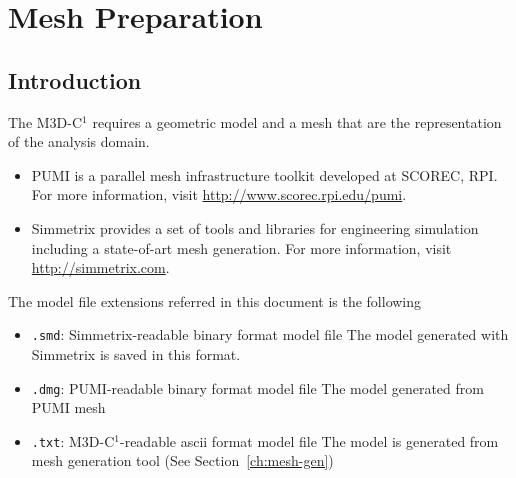 \section{Mesh Preparation}
\subsection{Introduction}

The M3D-C$^{1}$ requires a geometric model and a mesh that are the representation of the analysis domain. 
\begin{itemize}
\item PUMI is a parallel mesh infrastructure toolkit developed at SCOREC, RPI. For more information, visit \href{http://www.scorec.rpi.edu/pumi}{http://www.scorec.rpi.edu/pumi}.
\item	Simmetrix provides a set of tools and libraries for engineering simulation including a state-of-art mesh generation. For more information, visit \href{http://simmetrix.com}{http://simmetrix.com}.
\end{itemize}

The model file extensions referred in this document is the following
\begin{itemize}
\item \texttt{.smd}: Simmetrix-readable binary format model file  
\newline  The model generated with Simmetrix is saved in this format.
\item \texttt{.dmg}: PUMI-readable binary format model file
\newline	The model generated from PUMI mesh
\item	\texttt{.txt}: M3D-C$^{1}$-readable ascii format model file 
\newline	The model is generated from mesh generation tool (See Section~\ref{ch:mesh-gen})
\end{itemize}

